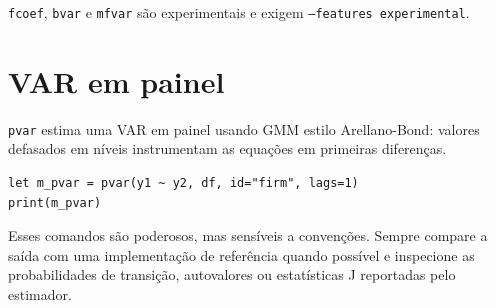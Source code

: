 \texttt{fcoef}, \texttt{bvar} e \texttt{mfvar} são experimentais e
exigem \texttt{--features experimental}.

\section{VAR em painel}

\texttt{pvar} estima uma VAR em painel usando GMM estilo Arellano-Bond:
valores defasados em níveis instrumentam as equações em primeiras
diferenças.

\begin{lstlisting}[caption={VAR em painel}]
let m_pvar = pvar(y1 ~ y2, df, id="firm", lags=1)
print(m_pvar)
\end{lstlisting}

Esses comandos são poderosos, mas sensíveis a convenções. Sempre
compare a saída com uma implementação de referência quando possível e
inspecione as probabilidades de transição, autovalores ou estatísticas
J reportadas pelo estimador.
